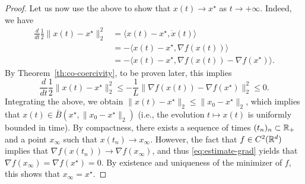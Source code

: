 \begin{proof}
         Let us now use the above to show that $x(t)\rightarrow x^\star$ as $t\to +\infty$.
         Indeed, we have
         \begin{equation}
             \begin{split}
                 \frac{d}{dt}\frac12\|x(t)-x^\star\|_2^2
                  & = \langle x(t)-x^\star, \dot x(t) \rangle                             \\
                  & = -\langle x(t)-x^\star, \nabla f( x(t)) \rangle                      \\
                  & = -\langle x(t)-x^\star, \nabla f( x(t)) - \nabla f(x^\star) \rangle.
             \end{split}
         \end{equation}
         By Theorem~\ref{th:co-coercivity}, to be proven later, this implies
         \begin{equation}
             \frac{d}{dt}\frac12\|x(t)-x^\star\|_2^2
             \le -\frac{1}{L} \|\nabla f(x(t))-\nabla f(x^\star)\|_2^2
             \le 0.
         \end{equation}
         Integrating the above, we obtain $\|x(t)-x^\star\|_2 \le \|x_0-x^\star\|_2$, which implies that $x(t)\in \bar B(x^\star, \|x_0-x^\star\|_2)$ (i.e., the evolution $t\mapsto x(t)$ is uniformly bounded in time).
         By compactness, there exists a sequence of times $(t_n)_n\subset \mathbb{R}_+$ and a point $x_\infty$ such that $x(t_n)\rightarrow x_\infty$.
         However, the fact that $f\in C^2(\mathbb{R}^d)$ implies that $\nabla f(x(t_n))\rightarrow \nabla f(x_\infty)$, and thus  \eqref{eq:estimate-grad} yields that $\nabla f(x_\infty) = \nabla f(x^\star)=0$.
         By existence and uniqueness of the minimizer of $f$, this shows that $x_\infty=x^\star$.
     \end{proof}
 
